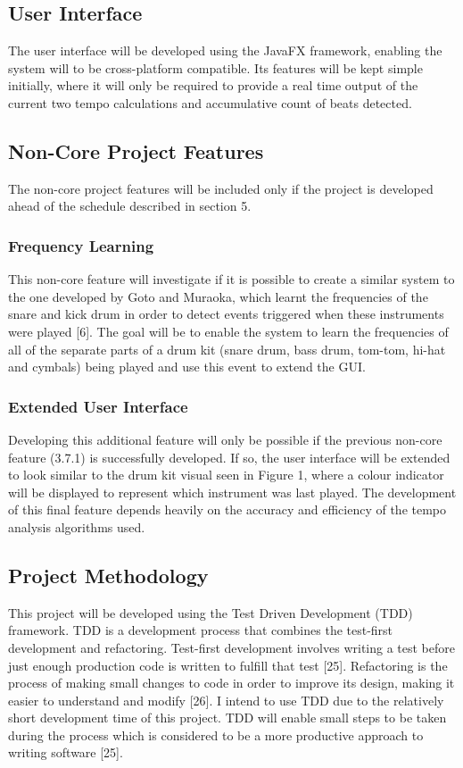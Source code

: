 \documentclass[a4paper, 11pt]{article}
\begin{document}
\subsection{User Interface}
The user interface will be developed using the JavaFX framework, enabling the system will to be cross-platform compatible. Its features will be kept simple initially, where it will only be required to provide a real time output of the current two tempo calculations and accumulative count of beats detected.

\subsection{Non-Core Project Features}
The non-core project features will be included only if the project is developed ahead of the schedule described in section 5. 

\subsubsection{Frequency Learning}
This non-core feature will investigate if it is possible to create a similar system to the one developed by Goto and Muraoka, which learnt the frequencies of the snare and kick drum in order to detect events triggered when these instruments were played [6]. The goal will be to enable the system to learn the frequencies of all of the separate parts of a drum kit (snare drum, bass drum, tom-tom, hi-hat and cymbals) being played and use this event to extend the GUI.

\subsubsection{Extended User Interface}
Developing this additional feature will only be possible if the previous non-core feature (3.7.1) is successfully developed. If so, the user interface will be extended to look similar to the drum kit visual seen in Figure 1, where a colour indicator will be displayed to represent which instrument was last played. The development of this final feature depends heavily on the accuracy and efficiency of the tempo analysis algorithms used.

\subsection{Project Methodology}
This project will be developed using the Test Driven Development (TDD) framework. TDD is a development process that combines the test-first development and refactoring. Test-first development involves writing a test before just enough production code is written to fulfill that test [25]. Refactoring is the process of making small changes to code in order to improve its design, making it easier to understand and modify [26]. I intend to use TDD due to the relatively short development time of this project. TDD will enable small steps to be taken during the process which is considered to be a more productive approach to writing software [25].
\end{document}
